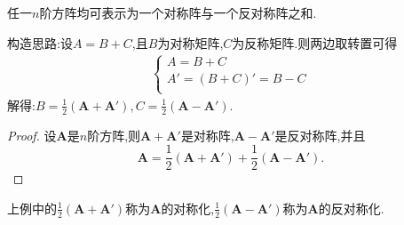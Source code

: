 \documentclass[../../main.tex]{subfiles}%
\begin{document}
\begin{proposition}\label{proposition:任一阶方阵可表示为对称阵与反对称阵之和}
任一\(n\)阶方阵均可表示为一个对称阵与一个反对称阵之和.
\end{proposition}
\begin{note}
构造思路:设$A=B+C$,且$B$为对称矩阵,$C$为反称矩阵.则两边取转置可得
\begin{align*}
\begin{cases}
A=B+C\\
A'=\left( B+C \right)'=B-C\\
\end{cases}
\end{align*}
解得:$B=\frac{1}{2}(\boldsymbol{A}+\boldsymbol{A}'),C=\frac{1}{2}(\boldsymbol{A}-\boldsymbol{A}')$.
\end{note}
\begin{proof}

设\(\boldsymbol{A}\)是\(n\)阶方阵,则\(\boldsymbol{A}+\boldsymbol{A}'\)是对称阵,\(\boldsymbol{A}-\boldsymbol{A}'\)是反对称阵,并且
\[
\boldsymbol{A}=\frac{1}{2}(\boldsymbol{A}+\boldsymbol{A}')+\frac{1}{2}(\boldsymbol{A}-\boldsymbol{A}').
\]

\end{proof}
\begin{remark}
上例中的\(\frac{1}{2}(\boldsymbol{A}+\boldsymbol{A}')\)称为\(\boldsymbol{A}\)的对称化,\(\frac{1}{2}(\boldsymbol{A}-\boldsymbol{A}')\)称为\(\boldsymbol{A}\)的反对称化.
\end{remark}
\end{document}
